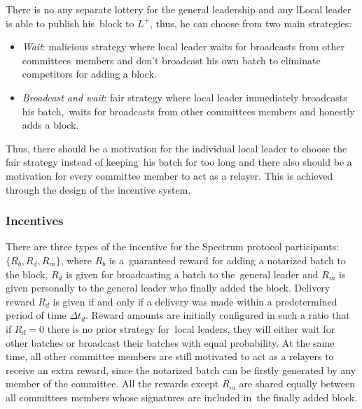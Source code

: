 There is no any separate lottery for the general leadership and any lLocal leader is able to publish his\
block to $L^+$, thus, he can choose from two main strategies:
\begin{itemize}
    \item \emph{Wait}: malicious strategy where local leader waits for broadcasts from other committees\
    members and don't broadcast his own batch to eliminate competitors for adding a block.
    \item \emph{Broadcast and wait}: fair strategy where local leader immediately broadcasts his batch,\
    waits for broadcasts from other committees members and honestly adds a block.
\end{itemize}
Thus, there should be a motivation for the individual local leader to choose the fair strategy instead of keeping\
his batch for too long and there also should be a motivation for every committee member to act as a relayer.
This is achieved through the design of the incentive system.

\subsubsection{Incentives}

There are three types of the incentive for the Spectrum protocol participants: ${\{R_b, R_d, R_m\}}$, where $R_b$ is a\
guaranteed reward for adding a notarized batch to the block, $R_d$ is given for broadcasting a batch to the\
general leader and $R_m$ is given personally to the general leader who finally added the block.
Delivery reward $R_d$ is given if and only if a delivery was made within a predetermined period of time $\Delta t_d$.
Reward amounts are initially configured in such a ratio that if ${R_d=0}$ there is no prior strategy for\
local leaders, they will either wait for other batches or broadcast their batches with equal probability.
At the same time, all other committee members are still motivated to act as a relayers to receive an extra reward,
since the notarized batch can be firstly generated by any member of the committee.
All the rewards except $R_m$ are shared equally between all committees members whose signatures are included in\
the finally added block.

